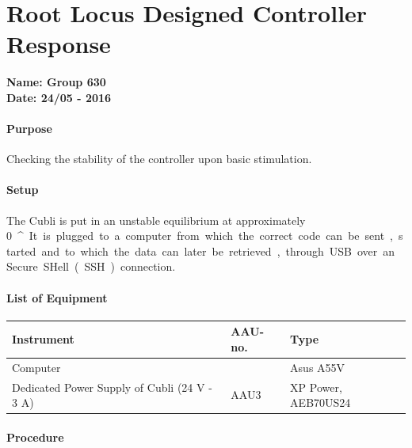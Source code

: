 \chapter{Root Locus Designed Controller Response} \label{app:hSISOControllerFinalTest}
\textbf{Name: Group 630}\\
\textbf{Date: 24/05 - 2016}

\subsubsection{Purpose}
Checking the stability of the controller upon basic stimulation.

\subsubsection{Setup}
The Cubli is put in an unstable equilibrium at approximately \SI{0}{^{\circ}}. 
It is plugged to a computer from which the correct code can be sent, started and to which the data can later be retrieved, through USB over an Secure SHell (SSH) connection.

\subsubsection{List of Equipment}
\begin{table}[H]
\begin{tabular}{|p{8cm}|p{2cm}|p{4cm}|}
\hline%
  \textbf{Instrument}    &  \textbf{AAU-no.}          &  \textbf{Type} \\
\hline%
  Computer               &            &  Asus A55V  \\
\hline%
Dedicated Power Supply of Cubli \small{(24 V - 3 A)} &  AAU3                   &  XP Power, AEB70US24                 \\
\hline%
\end{tabular}
\end{table}

\subsubsection{Procedure}


